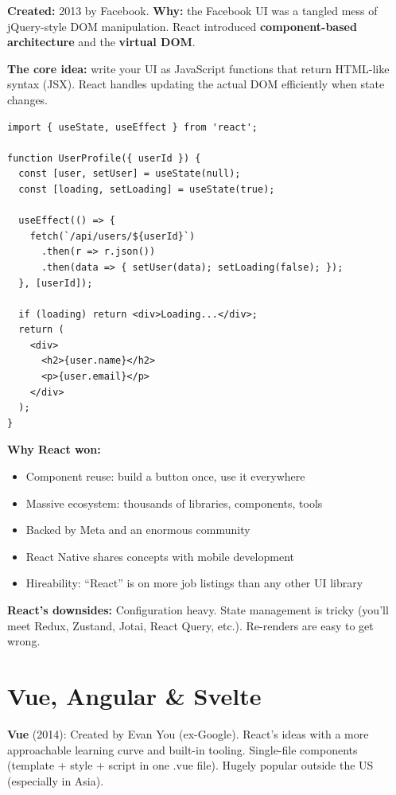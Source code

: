 \documentclass[11pt, letterpaper]{article}
\begin{document}
\textbf{Created:} 2013 by Facebook. \textbf{Why:} the Facebook UI was a tangled mess of jQuery-style DOM manipulation. React introduced \textbf{component-based architecture} and the \textbf{virtual DOM}.

\textbf{The core idea:} write your UI as JavaScript functions that return HTML-like syntax (JSX). React handles updating the actual DOM efficiently when state changes.

\begin{lstlisting}[style=code, caption={React component with hooks}]
import { useState, useEffect } from 'react';

function UserProfile({ userId }) {
  const [user, setUser] = useState(null);
  const [loading, setLoading] = useState(true);

  useEffect(() => {
    fetch(`/api/users/${userId}`)
      .then(r => r.json())
      .then(data => { setUser(data); setLoading(false); });
  }, [userId]);

  if (loading) return <div>Loading...</div>;
  return (
    <div>
      <h2>{user.name}</h2>
      <p>{user.email}</p>
    </div>
  );
}
\end{lstlisting}

\textbf{Why React won:}
\begin{itemize}[noitemsep]
  \item Component reuse: build a button once, use it everywhere
  \item Massive ecosystem: thousands of libraries, components, tools
  \item Backed by Meta and an enormous community
  \item React Native shares concepts with mobile development
  \item Hireability: ``React'' is on more job listings than any other UI library
\end{itemize}

\textbf{React's downsides:} Configuration heavy. State management is tricky (you'll meet Redux, Zustand, Jotai, React Query, etc.). Re-renders are easy to get wrong.

\section*{Vue, Angular \& Svelte}

\textbf{Vue} (2014): Created by Evan You (ex-Google). React's ideas with a more approachable learning curve and built-in tooling. Single-file components (template + style + script in one .vue file). Hugely popular outside the US (especially in Asia).
\end{document}
